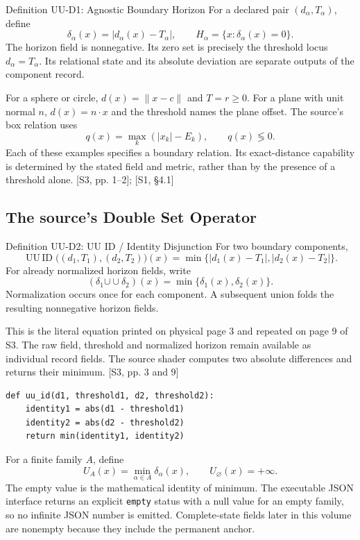 \documentclass[11pt,a4paper]{article}
\numberwithin{equation}{section}
\newcommand{\src}[2]{{\sffamily\small\color{slate}[#1, #2]}}
\newcommand{\uu}{\operatorname{UU\,ID}}
\newcommand{\dcup}{\mathbin{\cup\!\cup}}
\begin{document}
\begin{formal}{Definition UU-D1: Agnostic Boundary Horizon}
For a declared pair $(d_\alpha,T_\alpha)$, define
\[
\delta_\alpha(x)=|d_\alpha(x)-T_\alpha|,
\qquad H_\alpha=\{x:\delta_\alpha(x)=0\}.
\]
The horizon field is nonnegative. Its zero set is precisely the threshold locus $d_\alpha=T_\alpha$. Its relational state and its absolute deviation are separate outputs of the component record.
\end{formal}

For a sphere or circle, $d(x)=\|x-c\|$ and $T=r\ge0$. For a plane with unit normal $n$, $d(x)=n\cdot x$ and the threshold names the plane offset. The source's box relation uses
\begin{equation}
q(x)=\max_k(|x_k|-E_k),\qquad q(x)\lessgtr0.
\end{equation}
Each of these examples specifies a boundary relation. Its exact-distance capability is determined by the stated field and metric, rather than by the presence of a threshold alone. \src{S3}{pp. 1--2}; \src{S1}{\S4.1}

\subsection{The source's Double Set Operator}
\begin{formal}{Definition UU-D2: UU ID / Identity Disjunction}
For two boundary components,
\[
\boxed{\quad
\uu\big((d_1,T_1),(d_2,T_2)\big)(x)
=\min\{|d_1(x)-T_1|,|d_2(x)-T_2|\}.
\quad}
\]
For already normalized horizon fields, write
\[
(\delta_1\dcup\delta_2)(x)=\min\{\delta_1(x),\delta_2(x)\}.
\]
Normalization occurs once for each component. A subsequent union folds the resulting nonnegative horizon fields.
\end{formal}
This is the literal equation printed on physical page 3 and repeated on page 9 of S3. The raw field, threshold and normalized horizon remain available as individual record fields. The source shader computes two absolute differences and returns their minimum. \src{S3}{pp. 3 and 9}

\begin{lstlisting}
def uu_id(d1, threshold1, d2, threshold2):
    identity1 = abs(d1 - threshold1)
    identity2 = abs(d2 - threshold2)
    return min(identity1, identity2)
\end{lstlisting}

For a finite family $A$, define
\begin{equation}
U_A(x)=\min_{\alpha\in A}\delta_\alpha(x),
\qquad U_\varnothing(x)=+\infty.
\label{eq:finite-uuid}
\end{equation}
The empty value is the mathematical identity of minimum. The executable JSON interface returns an explicit \texttt{empty} status with a null value for an empty family, so no infinite JSON number is emitted. Complete-state fields later in this volume are nonempty because they include the permanent anchor.
\end{document}
